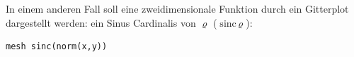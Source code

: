 \documentclass[DIV=14,headsepline,footsepline]{scrbook}
\begin{document}
				In einem anderen Fall soll eine zweidimensionale Funktion durch ein Gitterplot dargestellt werden: ein Sinus Cardinalis von $\varrho$ ($\text{sinc}\,\varrho$):
				\begin{lstlisting}
mesh sinc(norm(x,y))
				\end{lstlisting}
				\begin{figure}[p]%
					\centering
					\\
					\\

\end{figure}
\end{document}
